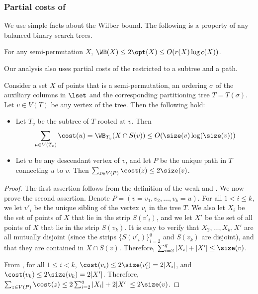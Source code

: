 \subsubsection{Partial costs of \WBone}

We use simple facts about the Wilber bound. The following is a property of any balanced binary search trees. 

\begin{lemma}\label{cor: upper bound on WB}
	For any semi-permutation $X$, 
	$\WB(X)\leq 2\opt(X) \leq O(r(X) \log c(X))$.
\end{lemma}

Our analysis also uses partial costs of the \WBone restricted to a subtree and a path. 

\begin{claim}\label{claim: bounds on WB for path and subtree}
Consider a set $X$ of points that is a semi-permutation, an ordering $\sigma$ of the auxiliary columns in $\lset$ and the corresponding partitioning tree $T=T(\sigma)$.  
%
 Let $v\in V(T)$ be any vertex of the tree. Then the following hold:
	\begin{itemize}
\item Let $T_v$ be the %
subtree   %
of $T$ rooted at $v$. Then $$\sum_{u\in V(T_v)}\cost(u) = \WB_{T_v}(X \cap S(v)) \leq O(\size(v)\log(\size(v)))$$
		\item Let $u$ be any descendant vertex of $v$, and let $P$ be the unique path in $T$ connecting $u$ to $v$. Then $\sum_{z\in V(P)}\cost(z)\leq 2\size(v)$.
	\end{itemize}
\end{claim}

\begin{proof}
    The first assertion follows from the definition of the weak \WBone and . We now prove the second assertion. Denote $P=(v=v_1,v_2,\ldots,v_k=u)$. For all $1<i\leq k$, we let $v'_i$ be the unique sibling of the vertex $v_i$ in the tree $T$. We also let $X_i$ be the set of points of $X$ that lie in the strip $S(v'_i)$, and we let $X'$ be the set of all points of $X$ that lie in the strip $S(v_k)$. 
It is easy to verify that $X_2,\ldots,X_k,X'$ are all mutually disjoint (since the strips $\{S(v'_i)\}_{i=2}^q$ and $S(v_k)$ are disjoint), and that they are contained in $X\cap S(v)$. 
Therefore, $\sum_{i=2}^q|X_i|+|X'|\leq \size(v)$.
	
	From , for all $1\leq i<k$, $\cost(v_i)\leq 2\size(v'_i)=2|X_i|$, and $\cost(v_k)\leq 2\size(v_k)=2|X'|$. Therefore, $\sum_{z\in V(P)}\cost(z)\leq 2\sum_{i=2}^q|X_i|+2|X'|\leq 2\size(v)$.
\end{proof}




